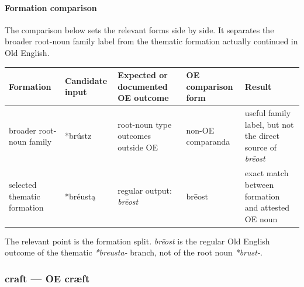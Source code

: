 \documentclass[
  british,
  a4paper,
]{article}
\newcounter{none} %
\begin{document}
\paragraph{Formation comparison}\label{formation-comparison}

The comparison below sets the relevant forms side by side. It separates
the broader root-noun family label from the thematic formation actually
continued in Old English.

{\def\LTcaptype{none} %
\begin{longtable}[]{@{}
  >{\raggedright\arraybackslash}p{}
  >{\raggedright\arraybackslash}p{}
  >{\raggedright\arraybackslash}p{}
  >{\raggedright\arraybackslash}p{}
  >{\raggedright\arraybackslash}p{}@{}}
\toprule\noalign{}
\begin{minipage}[b]{\linewidth}\raggedright
Formation
\end{minipage} & \begin{minipage}[b]{\linewidth}\raggedright
Candidate input
\end{minipage} & \begin{minipage}[b]{\linewidth}\raggedright
Expected or documented OE outcome
\end{minipage} & \begin{minipage}[b]{\linewidth}\raggedright
OE comparison form
\end{minipage} & \begin{minipage}[b]{\linewidth}\raggedright
Result
\end{minipage} \\
\midrule\noalign{}
\endhead
\bottomrule\noalign{}
\endlastfoot
broader root-noun family & *brústz & root-noun type outcomes outside OE
& non-OE comparanda & useful family label, but not the direct source of
\emph{brēost} \\
selected thematic formation & *bréustą & regular output: \emph{brēost} &
brēost & exact match between formation and attested OE noun \\
\end{longtable}
}

The relevant point is the formation split. \emph{brēost} is the regular
Old English outcome of the thematic \emph{*breusta-} branch, not of the
root noun \emph{*brust-}.

\subsubsection{craft --- OE cræft}\label{craft-oe-cruxe6ft}
\end{document}
